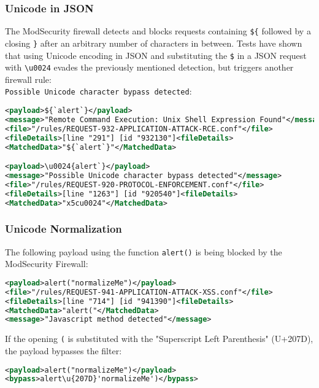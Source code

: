 \subsubsection{Unicode in JSON}
\label{sec:unicodeinjsontest}
The ModSecurity firewall detects and blocks requests containing \verb|${| followed by a closing \verb|}| after an arbitrary number of characters in between.
Tests have shown that using Unicode encoding in JSON and substituting the \verb|$| in a JSON request with \verb|\u0024| evades the previously mentioned detection, but triggers another firewall rule: \\
\verb|Possible Unicode character bypass detected|:

\begin{lstlisting}[style=ruleStyle, language=XML, caption=unicode tests \$\{`alert`\}, label={lst:jsonunicodetests}]
<payload>${`alert`}</payload>
<message>"Remote Command Execution: Unix Shell Expression Found"</message>
<file>"/rules/REQUEST-932-APPLICATION-ATTACK-RCE.conf"</file>
<fileDetails>[line "291"] [id "932130"]<fileDetails>
<MatchedData>"${`alert`}"</MatchedData>

<payload>\u0024{alert`}</payload>
<message>"Possible Unicode character bypass detected"</message>
<file>"/rules/REQUEST-920-PROTOCOL-ENFORCEMENT.conf"</file>
<fileDetails>[line "1263"] [id "920540"]<fileDetails>
<MatchedData>"x5cu0024"</MatchedData>
\end{lstlisting}

\subsubsection{Unicode Normalization}
The following payload using the function \verb|alert()| is being blocked by the ModSecurity Firewall:

\begin{lstlisting}[style=ruleStyle, language=XML, caption=alert("normalizeMe") blocked, label=lst:alertnormalizemeblocked]
<payload>alert("normalizeMe")</payload>
<file>"/rules/REQUEST-941-APPLICATION-ATTACK-XSS.conf"</file>
<fileDetails>[line "714"] [id "941390"]<fileDetails>
<MatchedData>"alert("</MatchedData>
<message>"Javascript method detected"</message>
\end{lstlisting}

If the opening \verb|(| is substituted with the "Superscript Left Parenthesis" (U+207D), the payload bypasses the filter:
\begin{lstlisting}[style=ruleStyle, language=XML, caption=alert('normalizeMe') bypass, label=lst:alertnormalizemebypass]
<payload>alert("normalizeMe")</payload>
<bypass>alert\u{207D}'normalizeMe')</bypass>
\end{lstlisting}

